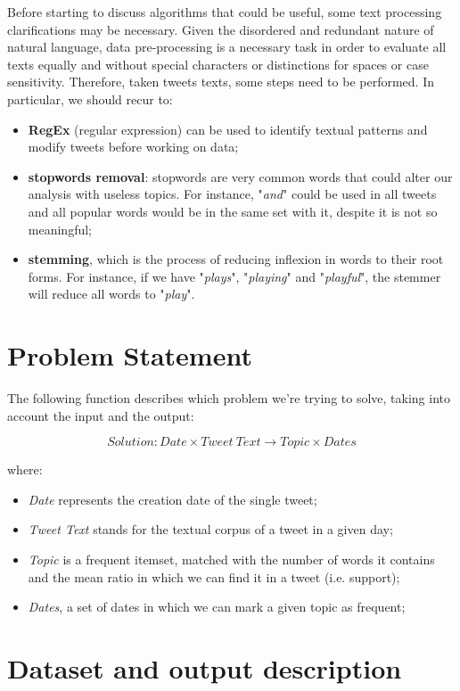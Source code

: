 Before starting to discuss algorithms that could be useful, some text processing clarifications may be necessary. Given the disordered and redundant nature of natural language, data pre-processing is a necessary task in order to evaluate all texts equally and without special characters or distinctions for spaces or case sensitivity. Therefore, taken tweets texts, some steps need to be performed. In particular, we should recur to:

\begin{itemize}
    \item \textbf{RegEx} (regular expression) can be used to identify textual patterns and modify tweets before working on data;
    \item \textbf{stopwords removal}: stopwords are very common words that could alter our analysis with useless topics. For instance, "\textit{and}" could be used in all tweets and all popular words would be in the same set with it, despite it is not so meaningful;
    \item \textbf{stemming}, which is the process of reducing inflexion in words to their root forms. For instance, if we have "\textit{plays}", "\textit{playing}" and "\textit{playful}", the stemmer will reduce all words to "\textit{play}".
\end{itemize}


\section{Problem Statement}
The following function describes which problem we're trying to solve, taking into account the input and the output:

\[ Solution: Date \times Tweet \ Text \rightarrow Topic \times Dates\]

where:
\begin{itemize}
    \item \textit{Date} represents the creation date of the single tweet;
    \item \textit{Tweet Text} stands for the textual corpus of a tweet in a given day;
    \item \textit{Topic} is a frequent itemset, matched with the number of words it contains and the mean ratio in which we can find it in a tweet (i.e. support);
    \item \textit{Dates}, a set of dates in which we can mark a given topic as frequent;
\end{itemize}

\section{Dataset and output description}

